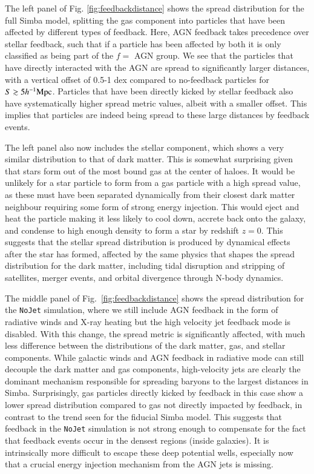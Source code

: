 \documentclass[fleqn,usenatbib]{mnras}
\newcommand{\hmpc}{h^{-1}{\rm Mpc}}
\newcommand{\simba}{{\sc Simba}}
\newcommand{\nojet}{{\tt NoJet}}
\begin{document}
The left panel of Fig. \ref{fig:feedbackdistance} shows the spread distribution
for the full \simba{} model, splitting the gas component into particles that
have been affected by different types of feedback. Here, AGN feedback takes
precedence over stellar feedback, such that if a particle has been affected
by both it is only classified as being part of the $f=$ AGN group. We see that
the particles that have directly interacted with the AGN are spread to
significantly larger distances, with a vertical offset of 0.5-1 dex compared
to no-feedback particles for $S \gtrsim 5\hmpc{}$. Particles that have been
directly kicked by stellar feedback also have systematically higher spread
metric values, albeit with a smaller offset. This implies that particles are
indeed being spread to these large distances by feedback events.

The left panel also now includes the stellar component, which shows a very
similar distribution to that of dark matter. This is somewhat surprising
given that stars form out of the most bound gas at the center of haloes. It
would be unlikely for a star particle to form from a gas particle with a high
spread value, as these must have been separated dynamically from their
closest dark matter neighbour requiring some form of strong energy injection.
This would eject and heat the particle making it less likely to cool down,
accrete back onto the galaxy, and condense to high enough density to form a
star by redshift $z = 0$. This suggests that the stellar spread distribution
is produced by dynamical effects after the star has formed, affected by the
same physics that shapes the spread distribution for the dark matter,
including tidal disruption and stripping of satellites, merger events, and
orbital divergence through N-body dynamics.

The middle panel of Fig.~\ref{fig:feedbackdistance} shows the spread
distribution for the \nojet{} simulation, where we still include AGN feedback
in the form of radiative winds and X-ray heating but the high velocity jet
feedback mode is disabled. With this change, the spread metric is
significantly affected, with much less difference between the distributions
of the dark matter, gas, and stellar components. While galactic winds and AGN
feedback in radiative mode can still decouple the dark matter and gas
components, high-velocity jets are clearly the dominant mechanism responsible
for spreading baryons to the largest distances in \simba{}. Surprisingly, gas
particles directly kicked by feedback in this case show a lower spread
distribution compared to gas not directly impacted by feedback, in contrast
to the trend seen for the fiducial \simba{} model. This suggests that
feedback in the \nojet{} simulation is not strong enough to compensate for the
fact that feedback events occur in the densest regions (inside galaxies). It is
intrinsically more difficult to escape these deep potential wells, especially
now that a crucial energy injection mechanism from the AGN jets is missing.
\end{document}
